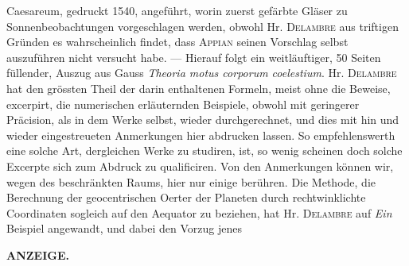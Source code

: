 Caesareum, gedruckt 1540, angeführt, worin zuerst gefärbte Gläser zu Sonnenbeobachtungen vorgeschlagen werden, obwohl Hr. \textsc{Delambre} aus triftigen Gründen es wahrscheinlich findet, dass \textsc{Appian} seinen Vorschlag selbst auszuführen nicht versucht habe. --- Hierauf folgt ein weitläuftiger, 50 Seiten füllender, Auszug aus Gauss \emph{Theoria motus corporum coelestium}. Hr. \textsc{Delambre} hat den grössten Theil der darin enthaltenen Formeln, meist ohne die Beweise, excerpirt, die numerischen erläuternden Beispiele, obwohl mit geringerer Präcision, als in dem Werke selbst, wieder durchgerechnet, und dies mit hin und wieder eingestreueten Anmerkungen hier abdrucken lassen. So empfehlenswerth eine solche Art, dergleichen Werke zu studiren, ist, so wenig scheinen doch solche Excerpte sich zum Abdruck zu qualificiren. Von den Anmerkungen können wir, wegen des beschränkten Raums, hier nur einige berühren. Die Methode, die Berechnung der geocentrischen Oerter der Planeten durch rechtwinklichte Coordinaten sogleich auf den Aequator zu beziehen, hat Hr. \textsc{Delambre} auf \emph{Ein} Beispiel angewandt, und dabei den Vorzug jenes\par
\clearpage
\noindent{}%
%
\parbox[t]{\dimexpr\linewidth-24mm\relax}{\centering\footnotesize\bfseries ANZEIGE.\par}%
\makebox[12mm][r]{}\par\nobreak\medskip
